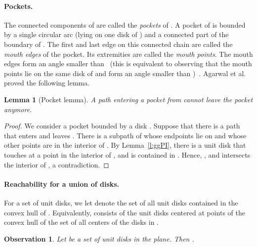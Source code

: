 \documentclass[a4paper]{article}
\newtheorem{lemma}[theorem]{Lemma}
\newtheorem{observation}[theorem]{Observation}
\begin{document}
\paragraph{Pockets.}

The connected components of  are called the
\emph{pockets} of .  A pocket of  is bounded by a single
circular arc (lying on one disk of ) and a connected part of
the boundary of . The first and last edge on this connected chain
are called the \emph{mouth edges} of the pocket.  Its extremities are
called the \emph{mouth points}.  The mouth edges form an angle smaller
than~ (this is equivalent to observing that the mouth points lie
on the same disk of  and form an angle smaller than
)~\cite{ablrsw-ccspc-02}. Agarwal et al.~\cite{ablrsw-ccspc-02}
proved the following lemma.


\begin{lemma}[Pocket lemma]\label{l:pocket}
  A path entering a pocket from  cannot leave the pocket
  anymore.
\end{lemma}
\begin{proof}
  We consider a pocket  bounded by a disk . Suppose that there
  is a path  that enters and leaves .  There is a subpath
   of  whose endpoints lie on  and whose other
  points are in the interior of .  By Lemma~\ref{l:ggPI}, there is
  a unit disk  that touches  at a point in the interior
  of , and is contained in . Hence, , and
   intersects the interior of , a contradiction.
\end{proof}

\paragraph{Reachability for a union of disks.}
 
For a set  of unit disks, we let  denote the set of
all unit disks contained in the convex hull of .
Equivalently,  consists of the unit disks centered at
points of the convex hull of the set of all centers of the disks in
.
\begin{observation}\label{obs:convd}
  \label{l:conv}
  Let  be a set of unit disks in the plane. Then .
\end{observation}
\end{document}

